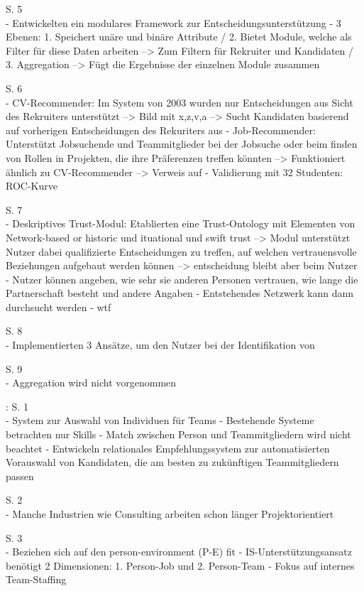 S. 5\\
- Entwickelten ein modulares Framework zur Entscheidungsunterstützung
- 3 Ebenen: 1. Speichert unäre und binäre Attribute / 2. Bietet Module, welche als Filter für diese Daten arbeiten --> Zum Filtern für Rekruiter und Kandidaten / 3. Aggregation --> Fügt die Ergebnisse der einzelnen Module zusammen

S. 6\\
- CV-Recommender: Im System von 2003 wurden nur Entscheidungen aus Sicht des Rekruiters unterstützt --> Bild mit x,z,v,a --> Sucht Kandidaten basierend auf vorherigen Entscheidungen des Rekuriters aus
- Job-Recommender: Unterstützt Jobsuchende und Teammitglieder bei der Jobsuche oder beim finden von Rollen in Projekten, die ihre Präferenzen treffen könnten --> Funktioniert ähnlich zu CV-Recommender --> Verweis auf \textcite{malinowski:2006}
- Validierung mit 32 Studenten: ROC-Kurve

S. 7\\
- Deskriptives Trust-Modul: Etablierten eine Trust-Ontology mit Elementen von Network-based or historic und ituational und swift trust --> Modul unterstützt Nutzer dabei qualifizierte Entscheidungen zu treffen, auf welchen vertrauensvolle Beziehungen aufgebaut werden können --> entscheidung bleibt aber beim Nutzer
- Nutzer können angeben, wie sehr sie anderen Personen vertrauen, wie lange die Partnerschaft besteht und andere Angaben
- Entstehendes Netzwerk kann dann durchsucht werden
- wtf

S. 8\\
- Implementierten 3 Ansätze, um den Nutzer bei der Identifikation von 

S. 9\\
- Aggregation wird nicht vorgenommen

\textcite{malinowski:2008}:
S. 1\\
- System zur Auswahl von Individuen für Teams
- Bestehende Systeme betrachten nur Skills - Match zwischen Person und Teammitgliedern wird nicht beachtet
- Entwickeln relationales Empfehlungssystem zur automatisierten Vorauswahl von Kandidaten, die am besten zu zukünftigen Teammitgliedern passen

S. 2\\
- Manche Industrien wie Consulting arbeiten schon länger Projektorientiert

S. 3\\
- Beziehen sich auf den person-environment (P-E) fit
- IS-Unterstützungsansatz benötigt 2 Dimensionen: 1. Person-Job und 2. Person-Team
- Fokus auf internes Team-Staffing

